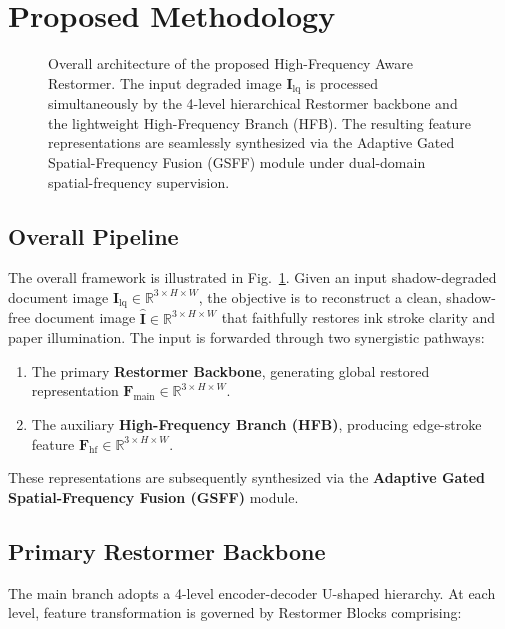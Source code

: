 \documentclass[conference]{IEEEtran}
\begin{document}
\section{Proposed Methodology}

\begin{figure}[t]
\centering
\fbox{\rule{0pt}{2.4in} \rule{0.92\linewidth}{0pt}}
\caption{Overall architecture of the proposed High-Frequency Aware Restormer. The input degraded image $\mathbf{I}_{\text{lq}}$ is processed simultaneously by the 4-level hierarchical Restormer backbone and the lightweight High-Frequency Branch (HFB). The resulting feature representations are seamlessly synthesized via the Adaptive Gated Spatial-Frequency Fusion (GSFF) module under dual-domain spatial-frequency supervision.}
\label{fig:framework}
\end{figure}

\subsection{Overall Pipeline}
The overall framework is illustrated in Fig.~\ref{fig:framework}. Given an input shadow-degraded document image $\mathbf{I}_{\text{lq}} \in \mathbb{R}^{3 \times H \times W}$, the objective is to reconstruct a clean, shadow-free document image $\hat{\mathbf{I}} \in \mathbb{R}^{3 \times H \times W}$ that faithfully restores ink stroke clarity and paper illumination. The input is forwarded through two synergistic pathways:
\begin{enumerate}
    \item The primary \textbf{Restormer Backbone}, generating global restored representation $\mathbf{F}_{\text{main}} \in \mathbb{R}^{3 \times H \times W}$.
    \item The auxiliary \textbf{High-Frequency Branch (HFB)}, producing edge-stroke feature $\mathbf{F}_{\text{hf}} \in \mathbb{R}^{3 \times H \times W}$.
\end{enumerate}
These representations are subsequently synthesized via the \textbf{Adaptive Gated Spatial-Frequency Fusion (GSFF)} module.

\subsection{Primary Restormer Backbone}
The main branch adopts a 4-level encoder-decoder U-shaped hierarchy. At each level, feature transformation is governed by Restormer Blocks comprising:
\end{document}
